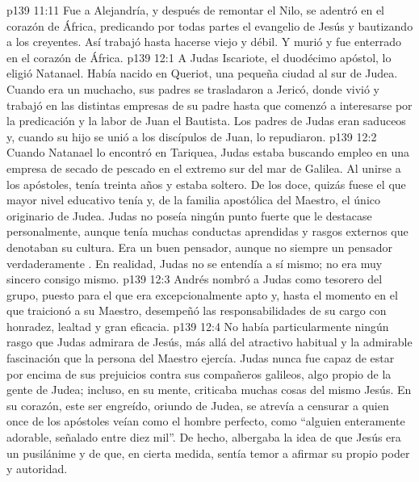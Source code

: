 \vs p139 11:11 Fue a Alejandría, y después de remontar el Nilo, se adentró en el corazón de África, predicando por todas partes el evangelio de Jesús y bautizando a los creyentes. Así trabajó hasta hacerse viejo y débil. Y murió y fue enterrado en el corazón de África.
\vs p139 12:1 A Judas Iscariote, el duodécimo apóstol, lo eligió Natanael. Había nacido en Queriot, una pequeña ciudad al sur de Judea. Cuando era un muchacho, sus padres se trasladaron a Jericó, donde vivió y trabajó en las distintas empresas de su padre hasta que comenzó a interesarse por la predicación y la labor de Juan el Bautista. Los padres de Judas eran saduceos y, cuando su hijo se unió a los discípulos de Juan, lo repudiaron.
\vs p139 12:2 \pc Cuando Natanael lo encontró en Tariquea, Judas estaba buscando empleo en una empresa de secado de pescado en el extremo sur del mar de Galilea. Al unirse a los apóstoles, tenía treinta años y estaba soltero. De los doce, quizás fuese el que mayor nivel educativo tenía y, de la familia apostólica del Maestro, el único originario de Judea. Judas no poseía ningún punto fuerte que le destacase personalmente, aunque tenía muchas conductas aprendidas y rasgos externos que denotaban su cultura. Era un buen pensador, aunque no siempre un pensador verdaderamente . En realidad, Judas no se entendía a sí mismo; no era muy sincero consigo mismo.
\vs p139 12:3 Andrés nombró a Judas como tesorero del grupo, puesto para el que era excepcionalmente apto y, hasta el momento en el que traicionó a su Maestro, desempeñó las responsabilidades de su cargo con honradez, lealtad y gran eficacia.
\vs p139 12:4 \pc No había particularmente ningún rasgo que Judas admirara de Jesús, más allá del atractivo habitual y la admirable fascinación que la persona del Maestro ejercía. Judas nunca fue capaz de estar por encima de sus prejuicios contra sus compañeros galileos, algo propio de la gente de Judea; incluso, en su mente, criticaba muchas cosas del mismo Jesús. En su corazón, este ser engreído, oriundo de Judea, se atrevía a censurar a quien once de los apóstoles veían como el hombre perfecto, como “alguien enteramente adorable, señalado entre diez mil”. De hecho, albergaba la idea de que Jesús era un pusilánime y de que, en cierta medida, sentía temor a afirmar su propio poder y autoridad.
